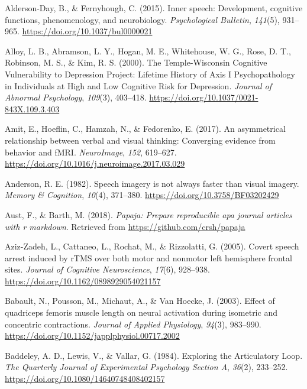 \documentclass[a4paper,12pt,twoside,onecolumn,openright,final,oldfontcommands]{memoir}
\begin{document}
\leavevmode\hypertarget{ref-alderson-day_inner_2015}{}%
Alderson-Day, B., \& Fernyhough, C. (2015). Inner speech: Development, cognitive functions, phenomenology, and neurobiology. \emph{Psychological Bulletin}, \emph{141}(5), 931--965. \url{https://doi.org/10.1037/bul0000021}

\leavevmode\hypertarget{ref-alloy_temple-wisconsin_2000}{}%
Alloy, L. B., Abramson, L. Y., Hogan, M. E., Whitehouse, W. G., Rose, D. T., Robinson, M. S., \& Kim, R. S. (2000). The Temple-Wisconsin Cognitive Vulnerability to Depression Project: Lifetime History of Axis I Psychopathology in Individuals at High and Low Cognitive Risk for Depression. \emph{Journal of Abnormal Psychology}, \emph{109}(3), 403--418. \url{https://doi.org/10.1037/0021-843X.109.3.403}

\leavevmode\hypertarget{ref-amit_asymmetrical_2017}{}%
Amit, E., Hoeflin, C., Hamzah, N., \& Fedorenko, E. (2017). An asymmetrical relationship between verbal and visual thinking: Converging evidence from behavior and fMRI. \emph{NeuroImage}, \emph{152}, 619--627. \url{https://doi.org/10.1016/j.neuroimage.2017.03.029}

\leavevmode\hypertarget{ref-anderson_speech_1982}{}%
Anderson, R. E. (1982). Speech imagery is not always faster than visual imagery. \emph{Memory \& Cognition}, \emph{10}(4), 371--380. \url{https://doi.org/10.3758/BF03202429}

\leavevmode\hypertarget{ref-R-papaja}{}%
Aust, F., \& Barth, M. (2018). \emph{Papaja: Prepare reproducible apa journal articles with r markdown}. Retrieved from \url{https://github.com/crsh/papaja}

\leavevmode\hypertarget{ref-Aziz-Zadeh2005}{}%
Aziz-Zadeh, L., Cattaneo, L., Rochat, M., \& Rizzolatti, G. (2005). Covert speech arrest induced by rTMS over both motor and nonmotor left hemisphere frontal sites. \emph{Journal of Cognitive Neuroscience}, \emph{17}(6), 928--938. \url{https://doi.org/10.1162/0898929054021157}

\leavevmode\hypertarget{ref-babault_effect_2003}{}%
Babault, N., Pousson, M., Michaut, A., \& Van Hoecke, J. (2003). Effect of quadriceps femoris muscle length on neural activation during isometric and concentric contractions. \emph{Journal of Applied Physiology}, \emph{94}(3), 983--990. \url{https://doi.org/10.1152/japplphysiol.00717.2002}

\leavevmode\hypertarget{ref-baddeley_exploring_1984}{}%
Baddeley, A. D., Lewis, V., \& Vallar, G. (1984). Exploring the Articulatory Loop. \emph{The Quarterly Journal of Experimental Psychology Section A}, \emph{36}(2), 233--252. \url{https://doi.org/10.1080/14640748408402157}
\end{document}
